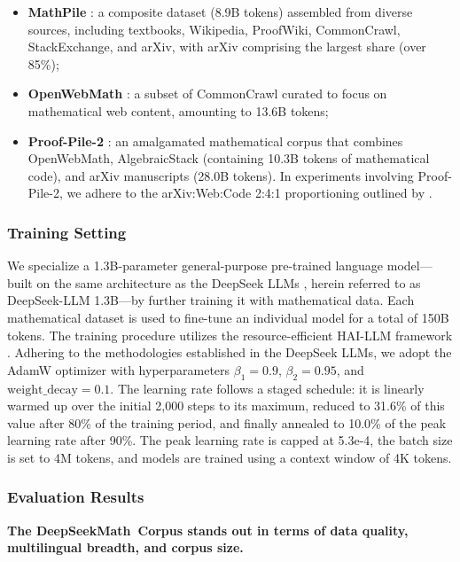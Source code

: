 \begin{itemize}[topsep=0pt]
\begin{itemize}[topsep=0pt]
    \item \textbf{MathPile} \citep{mathpile}: a composite dataset (8.9B tokens) assembled from diverse sources, including textbooks, Wikipedia, ProofWiki, CommonCrawl, StackExchange, and arXiv, with arXiv comprising the largest share (over 85\%);
    \item \textbf{OpenWebMath} \citep{openwebmath}: a subset of CommonCrawl curated to focus on mathematical web content, amounting to 13.6B tokens;
    \item \textbf{Proof-Pile-2} \citep{llemma}: an amalgamated mathematical corpus that combines OpenWebMath, AlgebraicStack (containing 10.3B tokens of mathematical code), and arXiv manuscripts (28.0B tokens). In experiments involving Proof-Pile-2, we adhere to the arXiv:Web:Code 2:4:1 proportioning outlined by \cite{llemma}.
\end{itemize}

\subsubsection{Training Setting}
\label{sec:quality-policy}
We specialize a 1.3B-parameter general-purpose pre-trained language model—built on the same architecture as the DeepSeek LLMs \citep{deepseek-llm}, herein referred to as DeepSeek-LLM 1.3B—by further training it with mathematical data. Each mathematical dataset is used to fine-tune an individual model for a total of 150B tokens. The training procedure utilizes the resource-efficient HAI-LLM framework \citep{haillm}. Adhering to the methodologies established in the DeepSeek LLMs, we adopt the AdamW optimizer \citep{adamW} with hyperparameters $\beta_1=0.9$, $\beta_2=0.95$, and $\mathrm{weight\_decay}=0.1$. The learning rate follows a staged schedule: it is linearly warmed up over the initial 2,000 steps to its maximum, reduced to 31.6\% of this value after 80\% of the training period, and finally annealed to 10.0\% of the peak learning rate after 90\%. The peak learning rate is capped at 5.3e-4, the batch size is set to 4M tokens, and models are trained using a context window of 4K tokens.

\subsubsection{Evaluation Results}

\textbf{The DeepSeekMath~Corpus stands out in terms of data quality, multilingual breadth, and corpus size.}


\end{itemize}
